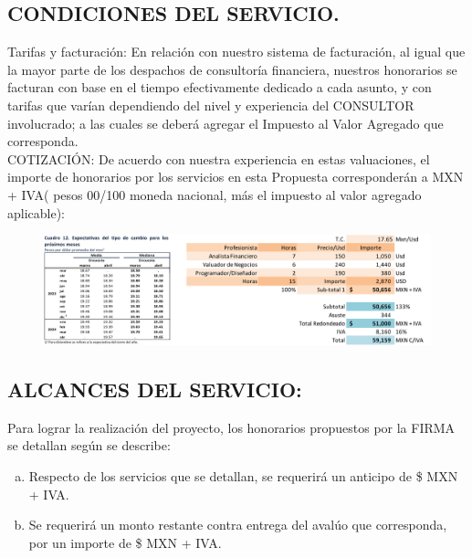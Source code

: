 \documentclass[5pt,letter]{article}
\begin{document}
 \begin{center}
 \section{CONDICIONES DEL SERVICIO.}
 \end{center}
 
\textcolor{principal}{Tarifas y facturación:} En relación con nuestro sistema de facturación, al igual que la mayor parte de los despachos de consultoría financiera, nuestros honorarios se facturan con base en el tiempo efectivamente dedicado a cada asunto, y con tarifas que varían dependiendo del
nivel y experiencia del CONSULTOR involucrado; a las cuales se deberá agregar el Impuesto
al Valor Agregado que corresponda.\\


\textcolor{principal}{COTIZACIÓN:} De acuerdo con nuestra experiencia en estas valuaciones, el importe de honorarios por los servicios en esta Propuesta corresponderán a \textcolor{principal}{MXN \honorarios{}  + IVA}(\honorariosLetra{} pesos 00/100 moneda nacional, más el impuesto al valor agregado aplicable):

 \begin{figure}[H]
 \centering
 \includegraphics[width=.9\textwidth]{cotizacion_1}
 \end{figure}



\begin{center}
\section{ALCANCES DEL SERVICIO:}
\end{center}

Para lograr la realización del proyecto, los honorarios propuestos por la FIRMA se detallan según se describe:\\
 
 \begin{enumerate}[a)]
 \item Respecto de los servicios que se detallan, se requerirá un anticipo de \$\anticipo{} MXN
 + IVA.
 
 \item Se requerirá un monto restante contra entrega del avalúo que corresponda, por un
 importe de \$\liquidacion{} MXN + IVA.
 
 \end{enumerate}
 
\end{document}
